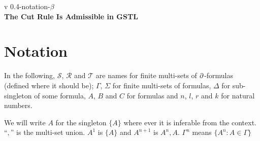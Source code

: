 \documentclass[a4paper, 12pt]{paper}
\begin{document}
{\noindent
	v 0.4-notation-$\beta$ \\
{\large\textbf{The Cut Rule Is Admissible in GSTL}}
}
\\
\setcounter{section}{-1}
\section{Notation} In the following, $\mathcal{S}$, $\mathcal{R}$ and $\mathcal{T}$ are names for finite multi-sets of $\partial$-formulas (defined where it should be); $\Gamma$, $\Sigma$ for finite multi-sets of formulas, $\Delta$ for sub-singleton of some formula, $A$, $B$ and $C$ for formulas and $n$, $l$, $r$ and $k$ for natural numbers.

We will write $A$ for the singleton $\{A\}$ where ever it is inferable from the context.
``$,$'' is the multi-set union.
$A^1$ is $\{A\}$ and $A^{n+1}$ is $A^n, A$. $\Gamma^n$ means $\{ A^n : A \in \Gamma \}$







\end{document}
